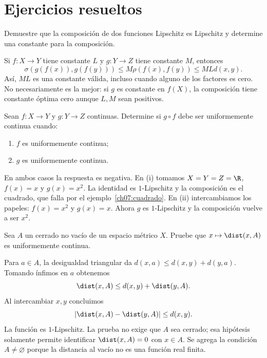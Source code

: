 \section{Ejercicios resueltos}
\begin{ejercicio}
Demuestre que la composición de dos funciones Lipschitz es Lipschitz y determine una constante para la composición.
\end{ejercicio}
\begin{solucion}
Si $f:X\to Y$ tiene constante $L$ y $g:Y\to Z$ tiene constante $M$, entonces
\[
 \sigma(g(f(x)),g(f(y)))\leq M\rho(f(x),f(y))\leq MLd(x,y).
\]
Así, $ML$ es una constante válida, incluso cuando alguno de los factores es cero. No necesariamente es la mejor: si $g$ es constante en $f(X)$, la composición tiene constante óptima cero aunque $L,M$ sean positivos.
\end{solucion}

\begin{ejercicio}
Sean $f:X\to Y$ y $g:Y\to Z$ continuas. Determine si $g\circ f$ debe ser uniformemente continua cuando: \begin{enumerate}[label=(\roman*)]
\item $f$ es uniformemente continua;
\item $g$ es uniformemente continua.
\end{enumerate}
\end{ejercicio}
\begin{solucion}
En ambos casos la respuesta es negativa. En (i) tomamos $X=Y=Z=\R$, $f(x)=x$ y $g(x)=x^2$. La identidad es $1$-Lipschitz y la composición es el cuadrado, que falla por el ejemplo~\ref{ch07:cuadrado}. En (ii) intercambiamos los papeles: $f(x)=x^2$ y $g(x)=x$. Ahora $g$ es $1$-Lipschitz y la composición vuelve a ser $x^2$.
\end{solucion}

\begin{ejercicio}
Sea $A$ un cerrado no vacío de un espacio métrico $X$. Pruebe que $x\mapsto\dist(x,A)$ es uniformemente continua.
\end{ejercicio}
\begin{solucion}
Para $a\in A$, la desigualdad triangular da $d(x,a)\leq d(x,y)+d(y,a)$. Tomando ínfimos en $a$ obtenemos
\[
 \dist(x,A)\leq d(x,y)+\dist(y,A).
\]
Al intercambiar $x,y$ concluimos
\[
 |\dist(x,A)-\dist(y,A)|\leq d(x,y).
\]
La función es $1$-Lipschitz. La prueba no exige que $A$ sea cerrado; esa hipótesis solamente permite identificar $\dist(x,A)=0$ con $x\in A$. Se agrega la condición $A\ne\varnothing$ porque la distancia al vacío no es una función real finita.
\end{solucion}

